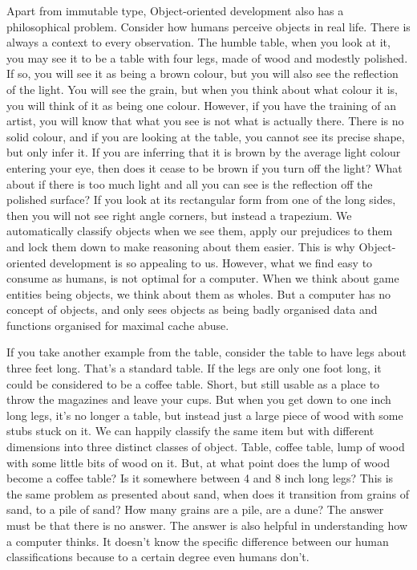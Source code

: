 Apart from immutable type, Object-oriented development also has a philosophical
problem. Consider how humans perceive objects in real life. There is always a
context to every observation. The humble table, when you look at it, you may
see it to be a table with four legs, made of wood and modestly polished. If so,
you will see it as being a brown colour, but you will also see the reflection
of the light. You will see the grain, but when you think about what colour it
is, you will think of it as being one colour. However, if you have the training
of an artist, you will know that what you see is not what is actually there.
There is no solid colour, and if you are looking at the table, you cannot see
its precise shape, but only infer it. If you are inferring that it is brown by
the average light colour entering your eye, then does it cease to be brown if
you turn off the light? What about if there is too much light and all you can
see is the reflection off the polished surface? If you look at its rectangular
form from one of the long sides, then you will not see right angle corners, but
instead a trapezium. We automatically classify objects when we see them, apply
our prejudices to them and lock them down to make reasoning about them easier.
This is why Object-oriented development is so appealing to us. However, what we
find easy to consume as humans, is not optimal for a computer. When we think
about game entities being objects, we think about them as wholes. But a
computer has no concept of objects, and only sees objects as being badly
organised data and functions organised for maximal cache abuse.

If you take another example from the table, consider the table to have legs
about three feet long. That's a standard table. If the legs are only one foot
long, it could be considered to be a coffee table. Short, but still usable as a
place to throw the magazines and leave your cups. But when you get down to one
inch long legs, it's no longer a table, but instead just a large piece of wood
with some stubs stuck on it. We can happily classify the same item but with
different dimensions into three distinct classes of object. Table, coffee
table, lump of wood with some little bits of wood on it. But, at what point
does the lump of wood become a coffee table? Is it somewhere between 4 and 8
inch long legs? This is the same problem as presented about sand, when does it
transition from grains of sand, to a pile of sand? How many grains are a pile,
are a dune? The answer must be that there is no answer. The answer is also
helpful in understanding how a computer thinks. It doesn't know the specific
difference between our human classifications because to a certain degree even
humans don't.

